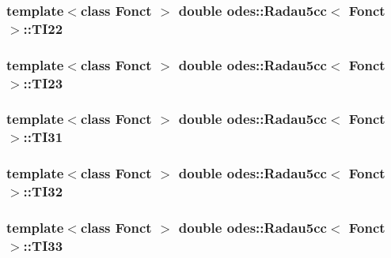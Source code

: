 \subsubsection[{T\+I22}]{\setlength{\rightskip}{0pt plus 5cm}template$<$class Fonct $>$ double {\bf odes\+::\+Radau5cc}$<$ Fonct $>$\+::T\+I22\hspace{0.3cm}{\ttfamily [private]}}\label{classodes_1_1Radau5cc_a77584ef2a5a6cccef4fe531e95c800d7}
\hypertarget{classodes_1_1Radau5cc_aafd01d1393c2dbe3edc148f073bf24f6}{}
\subsubsection[{T\+I23}]{\setlength{\rightskip}{0pt plus 5cm}template$<$class Fonct $>$ double {\bf odes\+::\+Radau5cc}$<$ Fonct $>$\+::T\+I23\hspace{0.3cm}{\ttfamily [private]}}\label{classodes_1_1Radau5cc_aafd01d1393c2dbe3edc148f073bf24f6}
\hypertarget{classodes_1_1Radau5cc_a0b21d463e63aaa3ae216def4605ed64a}{}
\subsubsection[{T\+I31}]{\setlength{\rightskip}{0pt plus 5cm}template$<$class Fonct $>$ double {\bf odes\+::\+Radau5cc}$<$ Fonct $>$\+::T\+I31\hspace{0.3cm}{\ttfamily [private]}}\label{classodes_1_1Radau5cc_a0b21d463e63aaa3ae216def4605ed64a}
\hypertarget{classodes_1_1Radau5cc_a6707fd7852c5536fcdc9a85cb78cef5c}{}
\subsubsection[{T\+I32}]{\setlength{\rightskip}{0pt plus 5cm}template$<$class Fonct $>$ double {\bf odes\+::\+Radau5cc}$<$ Fonct $>$\+::T\+I32\hspace{0.3cm}{\ttfamily [private]}}\label{classodes_1_1Radau5cc_a6707fd7852c5536fcdc9a85cb78cef5c}
\hypertarget{classodes_1_1Radau5cc_a6641ca56a3e50256303f70f839365c93}{}
\subsubsection[{T\+I33}]{\setlength{\rightskip}{0pt plus 5cm}template$<$class Fonct $>$ double {\bf odes\+::\+Radau5cc}$<$ Fonct $>$\+::T\+I33\hspace{0.3cm}{\ttfamily [private]}}\label{classodes_1_1Radau5cc_a6641ca56a3e50256303f70f839365c93}
\hypertarget{classodes_1_1Radau5cc_abdf9186a294f8720b8d5100335b6e39a}{}
